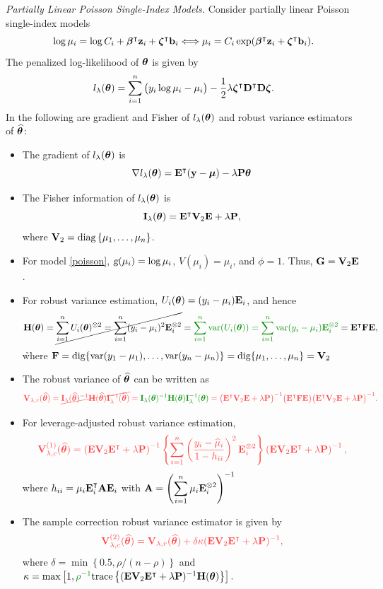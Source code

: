 \emph{Partially Linear Poisson Single-Index Models.}
Consider partially linear Poisson single-index models
\begin{equation}
	\log\mu_i = \log C_i+\bm\beta^\intercal\mathbf{z}_i+\bm\zeta^\intercal\mathbf{b}_i \Longleftrightarrow \mu_i = C_i\exp(\bm\beta^\intercal\mathbf{z}_i+\bm\zeta^\intercal\mathbf{b}_i). \label{poisson}
\end{equation}
The penalized log-likelihood of $\bm\theta$ is given by
\begin{equation*}
	l_\lambda(\bm\theta) = \sum_{i=1}^n \big(y_i\log\mu_i-\mu_i\big)- \frac{1}{2}\lambda\bm\zeta^\intercal\mathbf{D}^\intercal\mathbf{D}\bm\zeta.
\end{equation*}	
In the following are gradient and Fisher of $l_\lambda(\bm\theta)$ and robust variance estimators of $\widehat{\bm\theta}$:
\vspace{-0.35cm}
\begin{itemize}
	\item The gradient of $l_\lambda(\bm\theta)$ is
	$$
	\nabla l_\lambda(\bm\theta) = \mathbf{E}^\intercal(\mathbf{y}-\bm\mu)-\lambda\mathbf{P}\bm\theta
	$$
	\item  The Fisher information of $l_\lambda(\bm\theta)$ is
	$$
	\mathbf{I}_\lambda(\bm\theta) = \mathbf{E}^\intercal\mathbf{V}_2 \mathbf{E}+\lambda\mathbf{P},
	$$
	where $\mathbf{V}_2 = \text{diag}\left\{\mu_1,\ldots,\mu_n\right\}$. 
	\item For model \eqref{poisson}, $\textsl{g}(\mu_i) = \displaystyle\log\mu_i$, $V(\mu_i) = \mu_i$, and $\phi = 1$. Thus, $\mathbf{G} = \mathbf{V}_2\mathbf{E}$. 
	\item For robust variance estimation, $U_i(\bm\theta) = (y_i-\mu_i)\mathbf{E}_i$, and hence
	$$
	\BH(\Bt) = \cancel{\sum_{i=1}^n U_i(\Bt)^{\otimes 2}= \sum_{i=1}^n(y_i-\mu_i)^2\BE_i^{\otimes 2}}
	={\h  \sum_{i=1}^n \var(U_i(\Bt))=\sum_{i=1}^n\var(y_i-\mu_i)\BE_i^{\otimes 2}}
	= \BE^\p\BF\BE, 
	$$
{\h
where $\mathbf{F}=\text{dig}\{\text{var}(y_1-\mu_1),\dots,\text{var}(y_n-\mu_n)\}=\text{dig}\{\mu_1,\dots,\mu_n\}=\mathbf{V}_2$
}	
	
	\item The robust variance of $\widehat{\bm\theta}$ can be written as 
	$$
	{\x\BV_{\lambda,r}(\wh\Bt) = \cancel{\BI_\lambda(\wh\Bt)^{-1}\BH(\wh\Bt)\BI_\lambda^{-1}(\wh\Bt)}
		={\h\BI_\lambda(\Bt)^{-1}\BH(\Bt)\BI_\lambda^{-1}(\Bt)}
		= \bigl(\BE^\p\BV_2\BE+\lambda\BP\bigr)^{-1}\bigl(\BE^\p\BF\BE\bigr)\bigl(\BE^\p\BV_2\BE+\lambda\BP\bigr)^{-1}.}
	$$
	\item For leverage-adjusted robust variance estimation, 
	$$
	\x\BV_{\lambda,c}^{(1)}(\wh\Bt) 
	= \left(\BE\BV_2\BE^\p+\lambda\BP\right)^{-1}\left\{\sum_{i=1}^n\left(\frac{y_i-\wh\mu_i}{1-h_{ii}}\right)^2\BE_i^{\otimes 2}\right\}\left(\BE\BV_2\BE^\p+\lambda\BP\right)^{-1},
	$$
	where 
	$
	h_{ii} =\mu_i\mathbf{E}_i^\intercal\mathbf{A}\mathbf{E}_i
	$
	with 
	$\mathbf{A}  = \left(\displaystyle\sum_{i=1}^n\mu_i\mathbf{E}_i^{\otimes 2}\right)^{-1}
	$
	\item The sample correction robust variance estimator is given by
	$$
	\x\BV_{\lambda,c}^{(2)}(\wh\Bt) = \BV_{\lambda,r}(\wh\Bt)+\delta\kappa(\BE\BV_2\BE^\p+\lambda\BP)^{-1},
	$$
	where 
	$\delta = \min\left\{0.5,\rho/(n-\rho)\right\}$ and $\kappa = \max\left[1,{\h\rho^{-1}}\text{trace}\left\{(\BE\BV_2\BE^\p+\lambda\BP)^{-1}\BH(\Bt)\right\}\right].$	
\end{itemize}

